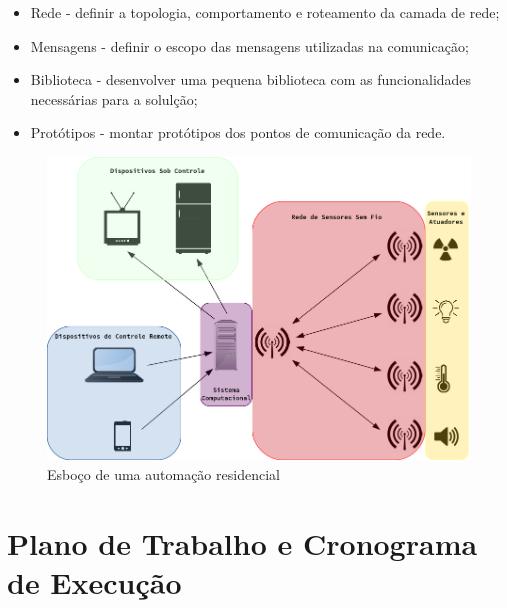 \documentclass[
    12pt,               %
    a4paper,            %
    english,            %
    brazil,             %
    ]{article}
\begin{document}
	\begin{itemize}
		\item Rede - definir a topologia, comportamento e roteamento da camada de rede;
		\item Mensagens - definir o escopo das mensagens utilizadas na comunicação;
		\item Biblioteca - desenvolver uma pequena biblioteca com as funcionalidades necessárias para a solulção;
		\item Protótipos - montar protótipos dos pontos de comunicação da rede.
	\end{itemize}

	\begin{figure}[H]
		\centering
		\includegraphics[width=\textwidth]{images/wsn.png}
		\caption{Esboço de uma automação residencial}
		\label{figura:wsn}
	\end{figure}


\section{Plano de Trabalho e Cronograma de Execução}
\end{document}
